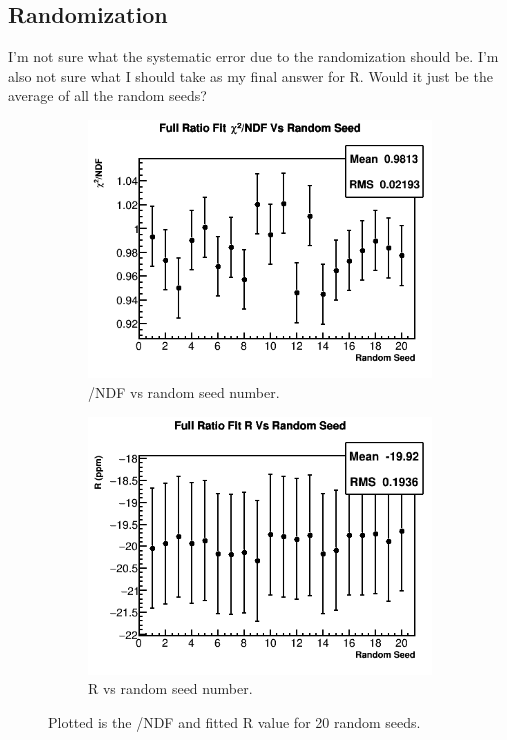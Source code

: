 \subsection{Randomization}

I'm not sure what the systematic error due to the randomization should be. I'm also not sure what I should take as my final answer for R. Would it just be the average of all the random seeds?

\begin{figure}[]
\centering
    \begin{subfigure}[t]{0.45\textwidth}
	    \centering
		\includegraphics[width=\textwidth]{RatioCBO_Chi2NDF_Vs_Iter_Canv}
	    \caption{\chisq/NDF vs random seed number.}
    \end{subfigure}
    \begin{subfigure}[t]{0.45\textwidth}
	    \centering
		\includegraphics[width=\textwidth]{RatioCBO_R_Vs_Iter_Canv}
	    \caption{R vs random seed number.}
    \end{subfigure}%
\caption[RandomSeeds]{Plotted is the \chisq/NDF and fitted R value for 20 random seeds.}
\label{fig:RandomSeeds}
\end{figure}

